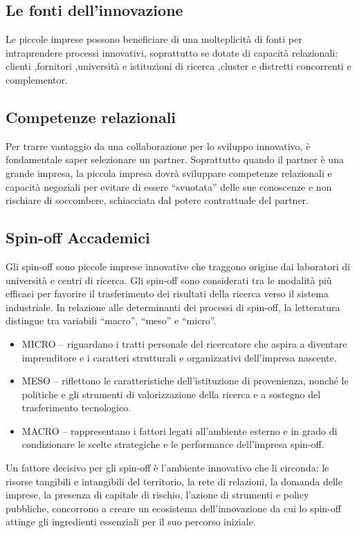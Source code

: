 \documentclass{article}
\begin{document}
\subsection{Le fonti dell'innovazione }
Le piccole imprese possono beneficiare di una molteplicità di fonti per
intraprendere processi innovativi, soprattutto se dotate di capacità relazionali:
clienti ,fornitori ,università e istituzioni di ricerca ,cluster e distretti concorrenti e complementor.

\subsection{Competenze relazionali}
Per trarre vantaggio da una collaborazione per lo
sviluppo innovativo, è fondamentale saper
selezionare un partner.
Soprattutto quando il partner è una grande
impresa, la piccola impresa dovrà sviluppare
competenze relazionali e capacità negoziali per
evitare di essere “svuotata” delle sue conoscenze
e non rischiare di soccombere, schiacciata dal
potere contrattuale del partner.


\subsection{Spin-off Accademici}
Gli spin-off sono piccole imprese innovative che traggono origine dai laboratori
di università e centri di ricerca.
Gli spin-off sono considerati tra le modalità più efficaci per favorire il
trasferimento dei risultati della ricerca verso il sistema industriale.
In relazione alle determinanti dei processi di spin-off, la letteratura distingue tra
variabili “macro”, “meso” e “micro”.
\begin{itemize}
	\item MICRO – riguardano i tratti personale del ricercatore che aspira a diventare
	imprenditore e i caratteri strutturali e organizzativi dell’impresa nascente.
	\item MESO – riflettono le caratteristiche dell’istituzione di provenienza, nonché le
	politiche e gli strumenti di valorizzazione della ricerca e a sostegno del
	trasferimento tecnologico.
	\item MACRO – rappresentano i fattori legati all’ambiente esterno e in grado di
	condizionare le scelte strategiche e le performance dell’impresa spin-off.
\end{itemize}

Un fattore decisivo per gli spin-off è l’ambiente innovativo che li circonda: le
risorse tangibili e intangibili del territorio, la rete di relazioni, la domanda delle
imprese, la presenza di capitale di rischio, l’azione di strumenti e policy pubbliche,
concorrono a creare un ecosistema dell’innovazione da cui lo spin-off attinge gli
ingredienti essenziali per il suo percorso iniziale.
\end{document}
